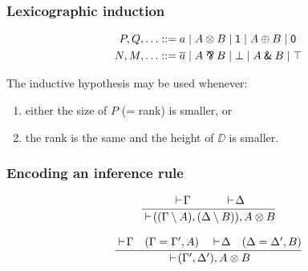 \documentclass{beamer}
\begin{document}
\begin{frame}[t]
  \frametitle{Lexicographic induction}

  \begin{align*}
    P, Q, \dotsc &::=
    a \mid A \TENS B \mid \ONE \mid
    A \PLUS B \mid \ZERO \\
    N, M, \dotsc &::=
    \dual a \mid A \PAR B \mid \BOT \mid
    A \WITH B \mid \TOP
  \end{align*}

  \pause


  \pause

  The inductive hypothesis may be used whenever:
  \begin{enumerate}
  \item either the size of $P$ (= rank) is smaller, or
  \item the rank is the same and the height of $\DD$ is smaller.
  \end{enumerate}
\end{frame}

\begin{frame}
  \frametitle{Encoding an inference rule}

  \larger


  \pause


  \begin{gather*}
    \infer{
      \ts ((\G \setminus A), (\D \setminus B)), A \TENS B
    }{
      \ts \G
      &
      \qquad
      \ts \D
    }
  \end{gather*}

  \pause

  \begin{gather*}
    \infer{
      \ts (\G', \D'), A \TENS B
    }{
      \ts \G
      &
      (\G = \G', A)
      &
      \ts \D
      &
      (\D = \D', B)
    }
  \end{gather*}
\end{frame}
\end{document}
